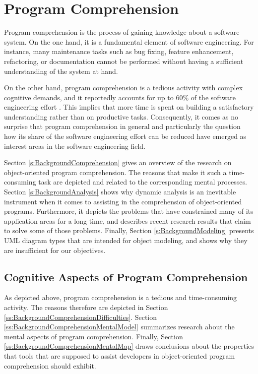 \chapter{Program Comprehension}
\label{c:Background}
Program comprehension is the process of gaining knowledge about a software system.
On the one hand, it is a fundamental element of software engineering.
For instance, many maintenance tasks such as bug fixing, feature enhancement, refactoring, or documentation cannot be performed without having a sufficient understanding of the system at hand.

On the other hand, program comprehension is a tedious activity with complex cognitive demands, and it reportedly accounts for up to 60\% of the software engineering effort \cite{corbi_program_1989, basili_evolving_1997}.
This implies that more time is spent on building a satisfactory understanding rather than on productive tasks.
Consequently, it comes as no surprise that program comprehension in general and particularly the question how its share of the software engineering effort can be reduced have emerged as interest areas in the software engineering field.

Section \ref{s:BackgroundComprehension} gives an overview of the research on object-oriented program comprehension.
The reasons that make it such a time-consuming task are depicted and related to the corresponding mental processes.
Section \ref{s:BackgroundAnalysis} shows why dynamic analysis is an inevitable instrument when it comes to assisting in the comprehension of object-oriented programs.
Furthermore, it depicts the problems that have constrained many of its application areas for a long time, and describes recent research results that claim to solve some of those problems.
Finally, Section \ref{s:BackgroundModeling} presents UML diagram types that are intended for object modeling, and shows why they are insufficient for our objectives. 

\section[Cognitive Aspects of Program Comprehension]{Cognitive Aspects of Program Comprehension%
}
\label{s:BackgroundComprehension}
As depicted above, program comprehension is a tedious and time-consuming activity.
The reasons therefore are depicted in Section \ref{ss:BackgroundComprehensionDifficulties}.
Section \ref{ss:BackgroundComprehensionMentalModel} summarizes research about the mental aspects of program comprehension.
Finally, Section \ref{ss:BackgroundComprehensionMentalMap} draws conclusions about the properties that tools that are supposed to assist developers in object-oriented program comprehension should exhibit. 

